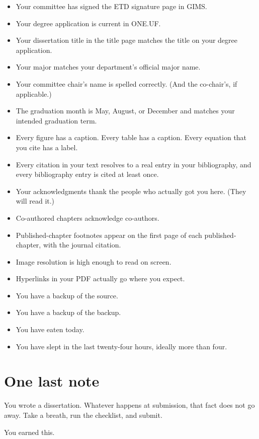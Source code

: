 \begin{itemize}
    \item Your committee has signed the ETD signature page in GIMS.
    \item Your degree application is current in ONE.UF.
    \item Your dissertation title in the title page matches the title
          on your degree application.
    \item Your major matches your department's official major name.
    \item Your committee chair's name is spelled correctly. (And the
          co-chair's, if applicable.)
    \item The graduation month is May, August, or December and matches
          your intended graduation term.
    \item Every figure has a caption. Every table has a caption. Every
          equation that you cite has a label.
    \item Every citation in your text resolves to a real entry in
          your bibliography, and every bibliography entry is cited at
          least once.
    \item Your acknowledgments thank the people who actually got you
          here. (They will read it.)
    \item Co-authored chapters acknowledge co-authors.
    \item Published-chapter footnotes appear on the first page of each
          published-chapter, with the journal citation.
    \item Image resolution is high enough to read on screen.
    \item Hyperlinks in your PDF actually go where you expect.
    \item You have a backup of the source.
    \item You have a backup of the backup.
    \item You have eaten today.
    \item You have slept in the last twenty-four hours, ideally more
          than four.
\end{itemize}

\section{One last note}

You wrote a dissertation. Whatever happens at submission, that fact
does not go away. Take a breath, run the checklist, and submit.

You earned this.
